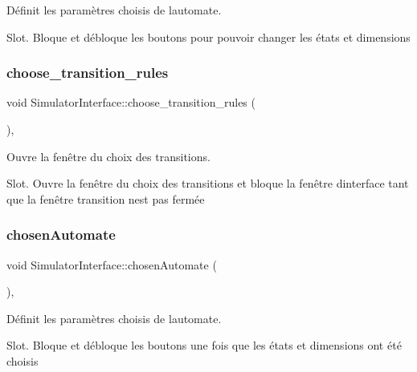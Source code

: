 Définit les paramètres choisis de l\textquotesingle{}automate. 

Slot. Bloque et débloque les boutons pour pouvoir changer les états et dimensions \mbox{\label{class_simulator_interface_a646f9fb84f5ec7e7cb4115b12f4a03bf}} 
\subsubsection{\texorpdfstring{choose\+\_\+transition\+\_\+rules}{choose\_transition\_rules}}
{\footnotesize\ttfamily void Simulator\+Interface\+::choose\+\_\+transition\+\_\+rules (\begin{DoxyParamCaption}{ }\end{DoxyParamCaption})\hspace{0.3cm}{\ttfamily [protected]}, {\ttfamily [slot]}}



Ouvre la fenêtre du choix des transitions. 

Slot. Ouvre la fenêtre du choix des transitions et bloque la fenêtre d\textquotesingle{}interface tant que la fenêtre transition n\textquotesingle{}est pas fermée \mbox{\label{class_simulator_interface_a6df53df15af33dadb613953e6f9771b6}} 
\subsubsection{\texorpdfstring{chosen\+Automate}{chosenAutomate}}
{\footnotesize\ttfamily void Simulator\+Interface\+::chosen\+Automate (\begin{DoxyParamCaption}{ }\end{DoxyParamCaption})\hspace{0.3cm}{\ttfamily [protected]}, {\ttfamily [slot]}}



Définit les paramètres choisis de l\textquotesingle{}automate. 

Slot. Bloque et débloque les boutons une fois que les états et dimensions ont été choisis \mbox{\label{class_simulator_interface_a08a37bff3f4287241055bd36cf6aafde}} 
